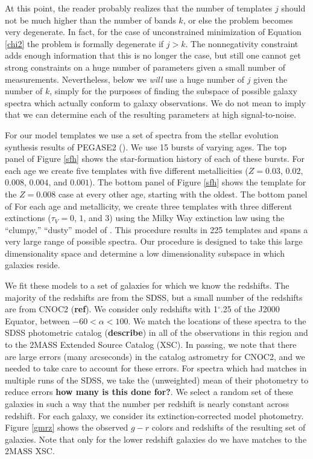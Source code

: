 \documentclass[10pt,preprint]{aastex}
\begin{document}
At this point, the reader probably realizes that the number of
templates $j$ should not be much higher than the number of bands $k$,
or else the problem becomes very degenerate. In fact, for the case of
unconstrained minimization of Equation \ref{chi2} the problem is
formally degenerate if $j>k$. The nonnegativity constraint adds enough
information that this is no longer the case, but still one cannot get
strong constraints on a huge number of parameters given a small number
of measurements. Nevertheless, below we {\it will} use a huge number
of $j$ given the number of $k$, simply for the purposes of finding the
subspace of possible galaxy spectra which actually conform to galaxy
observations. We do not mean to imply that we can determine each of
the resulting parameters at high signal-to-noise.

For our model templates we use a set of spectra from the stellar
evolution synthesis results of PEGASE2 (\citealt{fioc97a}). We use 15
bursts of varying ages. The top panel of Figure \ref{sfh} shows the
star-formation history of each of these bursts. For each age we create
five templates with five different metallicities ($Z=0.03$, $0.02$,
$0.008$, $0.004$, and $0.001$). The bottom panel of Figure \ref{sfh}
shows the template for the $Z=0.008$ case at every other age, starting
with the oldest. The bottom panel of For each age and metallicity, we
create three templates with three different extinctions ($\tau_V=0$,
$1$, and $3$) using the Milky Way extinction law using the ``clumpy,''
``dusty'' model of \citet{witt00a}. This procedure results in 225
templates and spans a very large range of possible spectra. Our
procedure is designed to take this large dimensionality space and
determine a low dimensionality subspace in which galaxies reside.

We fit these models to a set of galaxies for which we know the
redshifts. The majority of the redshifts are from the SDSS, but a
small number of the redshifts are from CNOC2 ({\bf ref}). We consider
only redshifts with 1$^\circ$.25 of the J2000 Equator, between
$-60<\alpha<100$. We match the locations of these spectra to the SDSS
photometric catalog ({\bf describe}) in all of the observations in
this region and to the 2MASS Extended Source Catalog (XSC). In
passing, we note that there are large errors (many arcseconds) in the
catalog astrometry for CNOC2, and we needed to take care to account
for these errors. For spectra which had matches in multiple runs of
the SDSS, we take the (unweighted) mean of their photometry to reduce
errors {\bf how many is this done for?}. We select a random set of
these galaxies in such a way that the number per redshift is nearly
constant across redshift. For each galaxy, we consider its
extinction-corrected model photometry. Figure \ref{gmrz} shows the
observed $g-r$ colors and redshifts of the resulting set of
galaxies. Note that only for the lower redshift galaxies do we have
matches to the 2MASS XSC.
\end{document}
